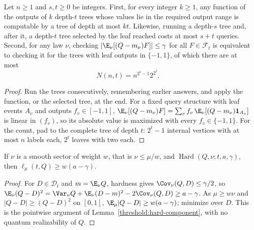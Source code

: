 \begin{lemma}\label{ian:hard-sector-tree-closure}
Let \(n\ge1\) and \(s,t\ge0\) be integers. First, for every integer \(k\ge1\), any function of the outputs of
\(k\) depth-\(t\) trees whose values lie in the required output range is computable by a tree of depth at most
\(kt\). Likewise, running a depth-\(s\) tree and, after it, a depth-\(t\) tree selected by the leaf reached
costs at most \(s+t\) queries. Second, for any law \(\nu\), checking \(|\E_\nu[(Q-m_\nu)F]|\le\gamma\) for all
\(F\in\mathcal F_t\) is equivalent to checking it for the trees with leaf outputs in \(\{-1,1\}\), of which
there are at most
\[N(n,t)=n^{2^t-1}2^{2^t}.\]
\end{lemma}
\begin{proof}
Run the trees consecutively, remembering earlier answers, and apply the function, or the selected tree, at the
end. For a fixed query structure with leaf events \(A_v\) and outputs \(f_v\in[-1,1]\),
\(\E_\nu[(Q-m_\nu)F]=\sum_vf_v\,\E_\nu[(Q-m_\nu)\mathbf1_{A_v}]\) is linear in \((f_v)\), so its absolute value
is maximized with every \(f_v\in\{-1,1\}\). For the count, pad to the complete tree of depth \(t\): \(2^t-1\)
internal vertices with at most \(n\) labels each, \(2^t\) leaves with two each.
\end{proof}

\begin{proposition}[H1-forward]\label{ian:hard-sector-forward}
If \(\nu\) is a smooth sector of weight \(w\), that is \(\nu\le\mu/w\), and
\(\operatorname{Hard}(Q,\nu;t,a,\gamma)\), then \(\ell_\mu(t,Q)\ge w(a-\gamma)\).
\end{proposition}
\begin{proof}
For \(D\in\mathcal D_t\) and \(m=\E_\nu Q\), hardness gives \(\Cov_\nu(Q,D)\le\gamma/2\), so
\(\E_\nu(Q-D)^2=\Var_\nu Q+\E_\nu(D-m)^2-2\Cov_\nu(Q,D)\ge a-\gamma\). As \(\mu\ge w\nu\) and
\(|Q-D|\ge(Q-D)^2\) on \([0,1]\), \(\E_\mu|Q-D|\ge w(a-\gamma)\); minimize over \(D\). This is the pointwise argument of
Lemma~\ref{threshold:hard-component}, with no quantum realizability of \(Q\).
\end{proof}

